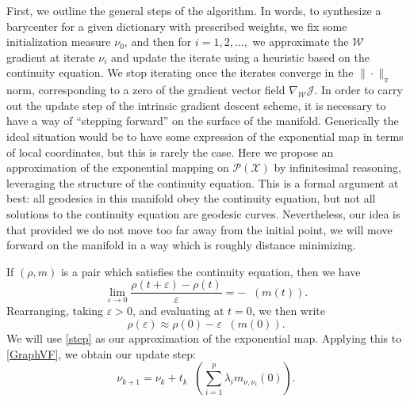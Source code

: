 \documentclass{article}
\newcommand{\J}{\mathcal{J}}
\newcommand{\W}{\mathcal{W}}
\newcommand{\X}{\mathcal{X}}
\DeclareMathOperator*{\divx}{div_{\X}}
\begin{document}
First, we outline the general steps of the algorithm. In words, to synthesize a barycenter for a given dictionary with prescribed weights, we fix some initialization measure \(\nu_0\), and then for \(i=1, 2, \dots, \) we approximate the \(\W\) gradient at iterate \(\nu_i\) and update the iterate using a heuristic based on the continuity equation.  We stop iterating once the iterates converge in the \(\|\cdot\|_\pi\) norm, corresponding to a zero of the gradient vector field \(\nabla_{\W}\J\).
In order to carry out the update step of the intrinsic gradient descent scheme, it is necessary to have a way of ``stepping forward'' on the surface of the manifold. Generically the ideal situation would be to have some expression of the exponential map in terms of local coordinates, but this is rarely the case. Here we propose an approximation of the exponential mapping on \(\mathcal{P}(\X)\) by infinitesimal reasoning, leveraging the structure of the continuity equation. This is a formal argument at best: all geodesics in this manifold obey the continuity equation, but not all solutions to the continuity equation are geodesic curves. Nevertheless, our idea is that provided we do not move too far away from the initial point, we will move forward on the manifold in a way which is roughly distance minimizing. 

If \((\rho,m)\) is a pair which satisfies the continuity equation, then we have
\[\lim\limits_{\varepsilon\to 0}\frac{\rho(t + \varepsilon) - \rho(t)}{\varepsilon} = -\divx(m(t)).\]
Rearranging, taking \(\varepsilon > 0\), and evaluating at \(t = 0\), we then write
\begin{equation}
\rho(\varepsilon) \approx \rho(0) - \varepsilon\divx(m(0)).
\label{step}
\end{equation}
We will use \eqref{step} as our approximation of the exponential map. Applying this to \eqref{GraphVF}, we obtain our update step: 
\begin{equation*}
    \nu_{k+1} = \nu_k + t_k\divx\left(\sum\limits_{i=1}^p\lambda_im_{\nu,\nu_i}(0)\right).
\end{equation*}
\end{document}
